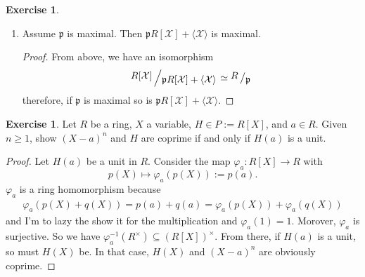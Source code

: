 \documentclass{book}
\theoremstyle{plain}
\theoremstyle{definition}
\newtheorem{exr}[thm]{Exercise}
\theoremstyle{custom_definition}
\newcommand{\bigslant}[2]{{\raisebox{.2em}{$#1$}\left/\raisebox{-.2em}{$#2$}\right.}}
\begin{document}
\begin{exr}
\begin{enumerate}
\begin{proof}
      Again for the contraction we have \(\varphi^{-1}(\mathfrak{p}R[\mathcal{X}] + \langle \mathcal{X} \rangle) = \mathfrak{p}\) (because we are basically only caring about \(a_0\)).
    \end{proof}
    \item Assume \(\mathfrak{p}\) is maximal. Then \(\mathfrak{p}R[\mathcal{X}] + \langle \mathcal{X} \rangle\) is maximal.
    \begin{proof}
      From above, we have an isomorphism
      \begin{equation}
        \bigslant{R[\mathcal{X}]}{\mathfrak{p}R[\mathcal{X}]+ \langle \mathcal{X} \rangle} \simeq \bigslant{R}{\mathfrak{p}}
      \end{equation}
      therefore, if \(\mathfrak{p}\) is maximal so is \(\mathfrak{p}R[\mathcal{X}] + \langle \mathcal{X} \rangle\).
    \end{proof}
  \end{enumerate}
\end{exr}

\begin{exr}
  Let \(R\) be a ring, \(X\) a variable, \(H \in P := R[X]\), and \(a \in R\). Given \(n \geq 1\), show \((X - a)^n\) and \(H\) are coprime if and only if \(H(a)\) is a unit.
\end{exr}
\begin{proof}
  Let \(H(a)\) be a unit in \(R\). Consider the map \(\varphi_a: R[X] \longrightarrow R\) with
  \begin{equation}
    p(X) \mapsto \varphi_a(p(X)) := p(a) \text{.}
  \end{equation}
  \(\varphi_a\) is a ring homomorphism because
  \begin{align}
    \varphi_a(p(X) + q(X)) = p(a) + q(a) = \varphi_a(p(X)) + \varphi_a(q(X))
  \end{align}
  and I'm to lazy the show it for the multiplication and \(\varphi_a(1) = 1\). Morover, \(\varphi_a\) is surjective. So we have \(\varphi^{-1}_a(R^\times) \subseteq (R[X])^\times\). From there, if \(H(a)\) is a unit, so must \(H(X)\) be. In that case, \(H(X)\) and \((X - a)^n\) are obviously coprime.


\end{proof}
\end{document}
